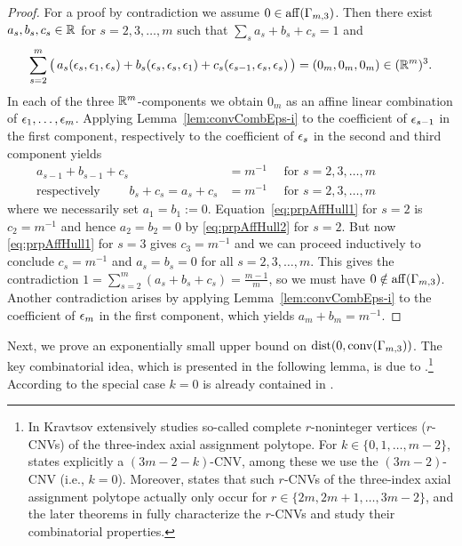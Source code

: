 \begin{proof}
	For a proof by contradiction we assume $0 \in \operatorname{aff}(\Gamma_{m,3})$.  Then there exist $a_s, b_s, c_s \in \mathbb R$ for $s=2,3,\ldots,m$ such that $\sum_s a_s + b_s + c_s = 1$ and
	\begin{align*}
		\sum_{s=2}^m \big( \, a_s (\epsilon_s, \epsilon_1, \epsilon_s) + b_s (\epsilon_s, \epsilon_s, \epsilon_1) + c_s (\epsilon_{s-1}, \epsilon_s, \epsilon_s) \, \big) = (0_m, 0_m, 0_m) \in (\mathbb R^m)^3.
	\end{align*}
	In each of the three $\mathbb R^m$-components we obtain $0_m$ as an affine linear combination of $\epsilon_1, \ldots,\epsilon_m$.
	Applying Lemma~\ref{lem:convCombEps-i} to the coefficient of $\epsilon_{s-1}$ in the first component,  respectively to the coefficient of $\epsilon_s$ in the second and third component yields
	\begin{align}
		a_{s-1} + b_{s-1} + c_{s} &= m^{-1} \quad \text{ for } s=2,3,\ldots,m \label{eq:prpAffHull1} \\[4pt]
		\text{respectively } \qquad
		b_s+ c_s = a_s + c_s &= m^{-1} \quad \text{ for } s=2,3,\ldots,m  \qquad\qquad \label{eq:prpAffHull2}
	\end{align}
	where we necessarily set $a_1 = b_1 := 0$. Equation~\eqref{eq:prpAffHull1} for $s=2$ is $c_2 = m^{-1}$ and hence $a_2=b_2=0$ by \eqref{eq:prpAffHull2} for $s=2$. But now \eqref{eq:prpAffHull1} for $s=3$ gives $c_3 = m^{-1}$ and we can proceed inductively to conclude $c_s = m^{-1}$ and $a_s = b_s = 0$ for all $s=2,3,\ldots,m$.  This gives the contradiction $1 = \sum_{s=2}^m (a_s + b_s + c_s) = \frac{m-1}{m}$, so we must have $0 \notin \operatorname{aff}(\Gamma_{m,3})$. Another contradiction arises by applying Lemma~\ref{lem:convCombEps-i} to the coefficient of $\epsilon_m$ in the first component, which yields $a_m + b_m = m^{-1}$.
\end{proof}

Next, we prove an exponentially small upper bound on $\operatorname{dist}(0, \operatorname{conv}(\Gamma_{m,3}))$.
The key combinatorial idea, which is presented in the following lemma, is due to \cite[Theorem~1 with $k=0$]{krav}.\footnote{In \cite{krav} Kravtsov extensively studies so-called complete $r$-noninteger vertices ($r$-CNVs) of the three-index axial assignment polytope. For $k \in \{0,1,\ldots,m-2\}$, \cite[Theorem~1]{krav} states explicitly a $(3m-2-k)$-CNV, among these we use the $(3m-2)$-CNV (i.e., $k=0$). Moreover, \cite[Theorem~2]{krav} states that such $r$-CNVs of the three-index axial assignment polytope actually only occur for $r \in \{2m,2m+1, \ldots, 3m-2\}$, and the later theorems in \cite{krav} fully characterize the $r$-CNVs and study their combinatorial properties.}  According to \cite{krav} the special case $k=0$ is already contained in \cite[Theorem~9]{luk}.

